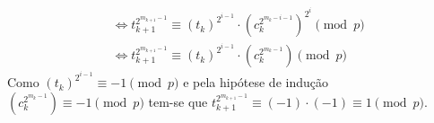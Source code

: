 \begin{enumerate}
\begin{itemize}
\begin{itemize}
\begin{itemize}
\begin{align*}
                            &
                            \Longleftrightarrow
                            t_{k+1}^{2^{m_{k+1} - 1}}
                            \equiv (t_k)^{2^{i - 1}} \cdot (c_{k}^{2^{m_k - i - 1}})^{2^{i}} \pmod{p}
                            \\
                            &
                            \Longleftrightarrow
                            t_{k+1}^{2^{m_{k+1} - 1}}
                            \equiv (t_k)^{2^{i - 1}} \cdot (c_{k}^{2^{m_k - 1}})\pmod{p}
                        \end{align*}
                        Como $(t_k)^{2^{i - 1}} \equiv -1 \pmod{p}$ e pela hipótese de indução
                        $(c_{k}^{2^{m_k - 1}}) \equiv -1 \pmod{p}$ tem-se que $t_{k+1}^{2^{m_{k+1} - 1}} \equiv (-1) \cdot (-1) \equiv 1 \pmod{p}$.

                        
                        

\end{itemize}
\end{itemize}
\end{itemize}
\end{enumerate}
